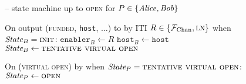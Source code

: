 \begin{figure}[H]
\begin{systembox}{\fchan{} -- state machine up to \textsc{open} for $P \in
  \{\mathit{Alice}, \mathit{Bob}\}$}
\begin{algorithmic}[1]
      \State On output (\textsc{funded}, \texttt{host}, $\dots$) to \bob by ITI
      $R \in \{\mathcal{F}_{\mathrm{Chan}}, \textsc{ln}\}$ when $\itistate_B = \textsc{init}$:
      \Indent
        \State $\texttt{enabler}_B \gets R$
        \State $\texttt{host}_B \gets \texttt{host}$
        \State $\itistate_B \gets \textsc{tentative virtual open}$
      \EndIndent
      \Statex

      \State On (\textsc{virtual open}) by \adversary when $\itistate_P =
      \textsc{tentative virtual open}$:
      \Indent
        \State $\itistate_P \gets \textsc{open}$
      \EndIndent
    \end{algorithmic}
  \end{systembox}
  \caption{}
  \label{code:functionality:open}
\end{figure}

